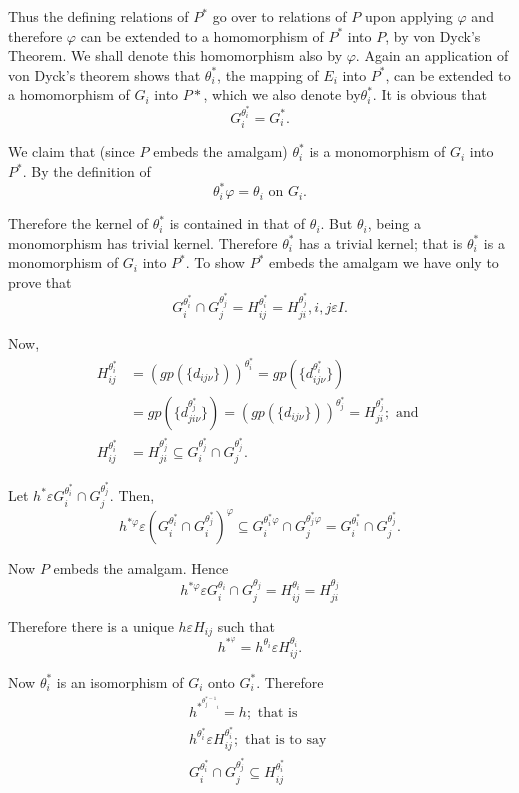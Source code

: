 Thus the defining relations of $P^*$ go over to relations of $P$ upon
applying $\varphi$ and therefore $\varphi$ can be extended to a
homomorphism of $P^*$ into $P$, by von Dyck's Theorem. We shall denote
this homomorphism also by $\varphi$. Again an application of von
Dyck's theorem shows that $\theta^*_i$, the mapping of $E_i$ into
$P^*$, can be extended to a homomorphism of $G_i$ into $P*$, which we
also denote by$\theta^*_i$. It is obvious that  
$$
G^{\theta^*_i}_i = G^*_i.
$$

We claim that (since $P$ embeds the amalgam) $\theta^*_i$ is a
monomorphism of $G_i$ into $P^*$. By the definition of  
$$
\theta^*_i \varphi = \theta_i \text{ on } G_i.
$$

Therefore the kernel of $\theta^*_i$ is contained in that of
$\theta_i$. But $\theta_i$, being a monomorphism has trivial
kernel. Therefore $\theta^*_i$ has a trivial kernel; that is
$\theta^*_i$ is a monomorphism of $G_i$ into $P^*$. To show $P^*$
embeds the amalgam we have only to prove that  
$$
G^{\theta^*_i}_i \cap G^{\theta^*_j}_j = H^{\theta^*_i}_{ij} =
H^{\theta^*_j}_{ji}, i,j \varepsilon I. 
$$

Now,
\begin{align*}
  H^{\theta^*_i}_{ij} & = \left(gp( \big\{ d_{i j \nu} \big\})\right)^{\theta^*_i}
  = gp \left( \big\{ d^{\theta^*_i}_{i j \nu} \big\}\right)\\ 
  & = gp \left( \big\{ d^{\theta^*_j}_{ j i \nu} \big\}\right) =
  \left(gp( \big\{ d_{i j 
    \nu} \big\})\right)^{\theta^*_j} = H^{\theta^*_j}_{ji} ; \text{ and }\\ 
  H^{\theta^*_i}_{ij} & = H^{\theta^*_j}_{ji}  \subseteq
  G^{\theta^*_j}_{i} \cap  G^{\theta^*_j}_{j}. 
\end{align*}

Let $h^* \varepsilon G^{\theta^*_i}_{i}  \cap G^{\theta^*_j}_{j}$. Then,
$$
h^{* \varphi} \varepsilon ( G^{\theta^*_i}_{i} \cap
G^{\theta^*_j}_{i})^{\varphi} \subseteq G^{\theta^*_i \varphi}_{i}
\cap G^{\theta^*_j \varphi}_{j} = G^{\theta^*_i}_{i} \cap
G^{\theta^*_j}_{j}. 
$$

Now $P$ embeds the amalgam. Hence 
$$
h^{* \varphi} \varepsilon G^{\theta_i}_{i} \cap G^{\theta_j}_{j} =
H^{\theta_i}_{ij} = H^{\theta_j}_{ji} 
$$

Therefore there is a unique $h \varepsilon H_{i j}$ such that 
$$
h^{*{^\varphi}} = h^{\theta_i} \varepsilon H^{\theta_i}_{ij}.
$$

Now ${\theta^*_i}$ is an isomorphism of $G_i$ onto $G^*_i$. Therefore 
\begin{gather*}
  h^{*^{{\theta^{*-1}_j}_{i}}} = h ; \text{ that is }\\
  h^{\theta^*_i} \varepsilon H^{\theta^*_i}_{ij} ; \text{ that is to say }\\
  G^{\theta^*_i}_{i} \cap G^{\theta^*_j}_{j} \subseteq H^{\theta^*_i}_{ij}
\end{gather*} 

